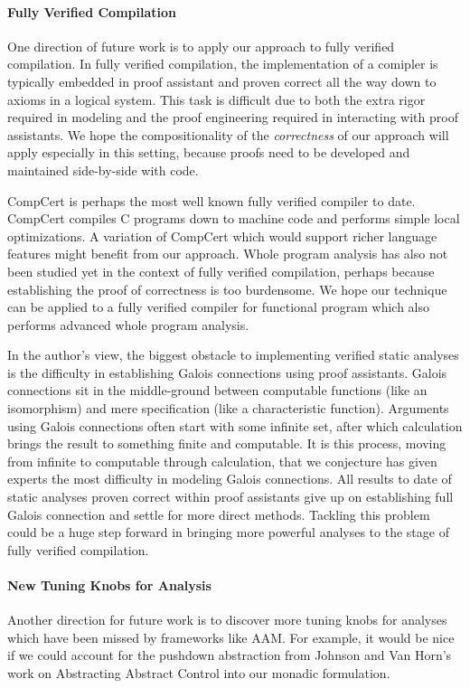 \documentclass{article}
\begin{document}
\paragraph{Fully Verified Compilation}
One direction of future work is to apply our approach to fully verified compilation.
In fully verified compilation, the implementation of a comipler is typically embedded in proof assistant and proven correct all the way down to axioms in a logical system.
This task is difficult due to both the extra rigor required in modeling and the proof engineering required in interacting with proof assistants.
We hope the compositionality of the \emph{correctness} of our approach will apply especially in this setting, because proofs need to be developed and maintained side-by-side with code.

CompCert\cite{leroy:2009:compcert} is perhaps the most well known fully verified compiler to date.
CompCert compiles C programs down to machine code and performs simple local optimizations.
A variation of CompCert which would support richer language features might benefit from our approach.
Whole program analysis has also not been studied yet in the context of fully verified compilation, 
  perhaps because establishing the proof of correctness is too burdensome.
We hope our technique can be applied to a fully verified compiler for functional program which also performs advanced whole program analysis.

In the author's view, the biggest obstacle to implementing verified static analyses is 
  the difficulty in establishing Galois connections using proof assistants.
Galois connections sit in the middle-ground between computable functions (like an isomorphism) 
  and mere specification (like a characteristic function).
Arguments using Galois connections often start with some infinite set, after which calculation brings the 
  result to something finite and computable.
It is this process, moving from infinite to computable through calculation, that we conjecture has given experts the most difficulty in modeling Galois connections.
All results to date of static analyses proven correct within proof assistants give up on establishing full Galois connection 
  and settle for more direct methods.
Tackling this problem could be a huge step forward in bringing more powerful analyses to the stage of fully verified compilation.

\paragraph{New Tuning Knobs for Analysis}
Another direction for future work is to discover more tuning knobs for analyses which have been missed by frameworks like AAM.
For example, it would be nice if we could account for the pushdown abstraction 
  from Johnson and Van Horn's work on Abstracting Abstract Control into our monadic formulation.
\end{document}
